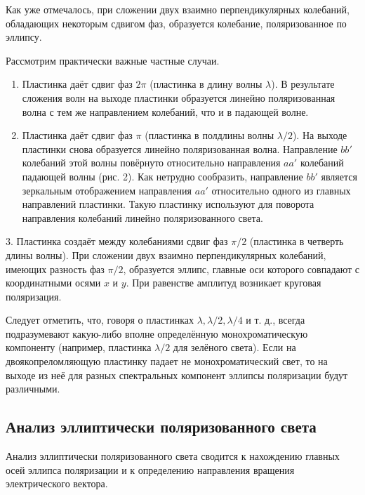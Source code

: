\documentclass[a4paper, 12pt]{article}
\begin{document}
Как уже отмечалось, при сложении двух взаимно перпендикулярных колебаний, обладающих некоторым сдвигом фаз, образуется колебание, поляризованное по эллипсу.



Рассмотрим практически важные частные случаи.

 \begin{enumerate}
 		
 	\item Пластинка даёт сдвиг фаз $ 2\pi $ (пластинка в длину волны $ \lambda $). В результате сложения волн на выходе пластинки образуется линейно поляризованная волна с тем же направлением колебаний, что и в падающей волне.

	\item Пластинка даёт сдвиг фаз $ \pi $ (пластинка в полдлины волны $ \lambda / 2 $). На выходе пластинки снова образуется линейно поляризованная волна. Направление $ bb' $ колебаний этой волны повёрнуто относительно направления $ aa' $ колебаний падающей волны (рис. 2). Как нетрудно сообразить, направление $ bb' $ является зеркальным отображением направления $ aa' $ относительно одного из главных направлений пластинки. Такую пластинку используют для поворота направления колебаний линейно поляризованного света.

 \end{enumerate}
 	
3.  Пластинка создаёт между колебаниями сдвиг фаз $ \pi/2 $ (пластинка
в четверть длины волны). При сложении двух взаимно перпендикулярных колебаний, имеющих разность фаз $ \pi/2 $, образуется эллипс, главные оси которого совпадают с координатными осями $ x $ и $ y $. При равенстве амплитуд возникает круговая поляризация.
 	


Следует отметить, что, говоря о пластинках $ \lambda , \lambda/2, \lambda/4  $ и т. д., всегда подразумевают какую-либо вполне определённую монохроматическую
компоненту (например, пластинка $ \lambda/2 $ для зелёного света). Если на двоякопреломляющую пластинку падает не монохроматический свет, то на
выходе из неё для разных спектральных компонент эллипсы поляризации будут различными.

\subsection{Анализ эллиптически поляризованного света}

Анализ эллиптически поляризованного света сводится к нахождению главных осей
эллипса поляризации и к определению направления вращения электрического вектора.
\end{document}
